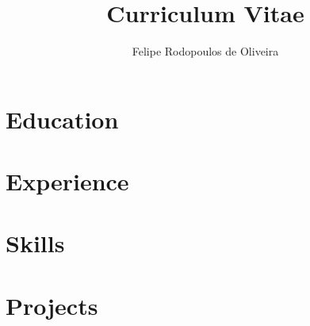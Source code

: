\documentclass{cv}
\title{Curriculum Vitae}
\author{Felipe Rodopoulos de Oliveira}
\begin{document}
  \maketitle

  \section{Education}
  \section{Experience}
  \section{Skills}
  \section{Projects}
\end{document}
